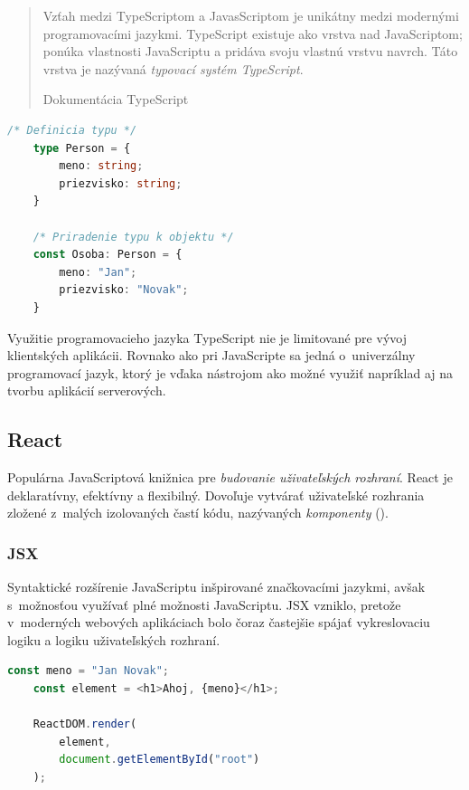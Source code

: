 \blockquote[Dokumentácia TypeScript \cite{TSWeb}]{Vzťah medzi TypeScriptom a JavasScriptom je unikátny medzi modernými programovacími jazykmi. TypeScript existuje ako vrstva nad JavaScriptom; ponúka vlastnosti JavaScriptu a pridáva svoju vlastnú vrstvu navrch. Táto vrstva je nazývaná \emph{typovací systém TypeScript}.}

\begin{lstlisting}[language=TypeScript, caption=Príklad zápisu v~programovacom jazyku TypeScript.]
	/* Definicia typu */
	type Person = {
		meno: string;
		priezvisko: string;
	}

	/* Priradenie typu k objektu */
	const Osoba: Person = {
		meno: "Jan";
		priezvisko: "Novak";
	}
\end{lstlisting}

\bigskip

\noindent Využitie programovacieho jazyka TypeScript nie je limitované pre vývoj klientských aplikácii. Rovnako ako pri JavaScripte sa jedná o~univerzálny programovací jazyk, ktorý je vďaka nástrojom ako  možné využiť napríklad aj na tvorbu aplikácií serverových.

\subsection{React}
\label{subsection:react}
Populárna JavaScriptová knižnica pre \emph{budovanie uživateľských rozhraní}. React je deklaratívny, efektívny a flexibilný. Dovoľuje vytvárať uživateľské rozhrania zložené z~malých izolovaných častí kódu, nazývaných \emph{komponenty} (). \cite{React}

\subsubsection{JSX}
Syntaktické rozšírenie JavaScriptu inšpirované značkovacími jazykmi, avšak s~možnosťou využívať plné možnosti JavaScriptu. JSX vzniklo, pretože v~moderných webových aplikáciach bolo čoraz častejšie spájať vykreslovaciu logiku a logiku uživateľských rozhraní. \cite{React} \\

\begin{lstlisting}[language=TypeScript, caption=Príklad využitia JSX v~React aplikácií. \cite{React}]
	const meno = "Jan Novak";
	const element = <h1>Ahoj, {meno}</h1>;

	ReactDOM.render(
		element,
		document.getElementById("root")
	);
\end{lstlisting}

